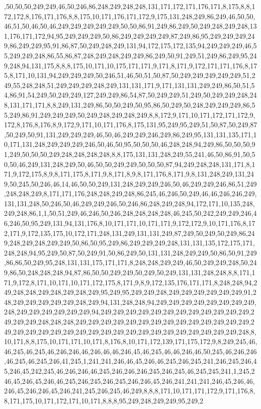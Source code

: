 ,50,50,50,249,249,46,50,246,86,248,249,248,248,131,171,172,171,176,171,8,175,8,8,172,172,8,176,171,176,8,8,175,10,171,176,171,172,9,175,131,248,249,86,249,46,50,50,46,51,50,46,50,46,249,249,249,249,249,50,50,86,91,249,86,249,50,249,248,249,248,131,176,171,172,94,95,249,249,249,50,86,249,249,249,249,87,249,86,95,249,249,249,249,86,249,249,95,91,86,87,50,249,248,249,131,94,172,175,172,135,94,249,249,249,46,55,249,249,248,86,55,86,87,248,249,248,249,249,86,249,50,91,249,51,249,86,249,95,249,248,94,131,175,8,8,8,175,10,171,10,175,171,171,9,171,8,171,9,172,171,171,176,8,175,8,171,10,131,94,249,249,249,50,246,51,46,50,51,50,87,50,249,249,249,249,249,51,249,55,248,248,51,249,249,249,248,249,131,131,171,9,171,131,131,249,249,86,50,51,54,86,91,54,249,50,249,249,127,249,249,86,54,87,50,249,249,51,249,50,249,249,248,248,131,171,171,8,8,249,131,249,86,50,50,249,50,95,86,50,249,50,248,249,249,249,86,55,249,86,91,249,249,249,50,249,248,249,248,249,8,8,172,9,171,10,171,172,171,172,9,172,8,176,8,176,8,9,172,9,171,10,171,176,8,175,131,95,249,95,249,51,50,87,50,249,87,50,249,50,91,131,249,249,249,46,50,46,249,249,246,249,86,249,95,131,131,135,171,10,171,131,248,249,249,249,246,50,46,50,95,50,50,50,46,248,248,94,249,86,50,50,50,91,249,50,50,50,249,248,248,248,248,8,8,175,131,131,248,249,55,241,46,50,86,91,50,50,50,46,249,131,248,249,50,46,50,50,249,249,50,50,50,87,94,249,248,248,131,171,8,171,9,172,175,8,9,8,171,175,8,171,9,8,171,8,9,8,171,176,8,171,9,8,131,248,249,131,249,50,245,50,246,46,14,46,50,50,249,131,248,249,249,246,50,46,249,249,246,86,51,249,248,248,249,8,171,171,176,248,248,249,248,86,245,46,246,50,249,46,46,246,246,249,131,131,248,50,246,50,46,249,249,246,50,246,86,248,249,248,94,172,171,10,135,248,249,248,86,1,1,50,51,249,46,246,50,246,248,248,248,248,46,245,50,242,249,249,246,46,246,50,95,249,131,94,131,176,8,10,171,171,10,171,171,9,172,172,9,10,171,176,8,172,171,9,172,135,175,10,172,171,248,131,249,131,131,249,87,249,50,249,50,249,86,249,248,249,248,249,249,50,86,50,95,249,86,249,249,249,248,131,131,135,172,175,171,248,248,94,95,249,50,87,50,249,91,50,86,249,50,131,131,248,249,249,50,86,50,91,249,86,86,50,249,95,248,131,131,175,171,171,8,248,248,249,249,46,50,249,249,248,50,249,86,50,248,248,248,94,87,86,50,50,249,249,50,249,50,249,131,131,248,248,8,8,171,171,9,172,8,171,10,171,10,171,172,175,8,171,9,8,9,172,135,176,171,171,8,248,248,94,249,248,248,249,248,249,248,249,95,249,95,249,249,248,249,249,249,249,249,249,91,248,249,249,249,249,249,248,249,94,131,248,248,94,249,249,249,249,249,249,249,249,248,249,249,249,249,249,249,94,249,249,249,249,249,249,249,249,249,249,249,249,249,249,249,248,248,248,249,249,249,249,249,249,249,249,249,249,249,249,249,249,249,249,249,249,249,249,249,249,249,249,249,249,249,249,249,249,249,249,249,248,8,10,171,8,8,175,10,171,171,10,171,8,176,8,10,171,172,139,171,175,172,9,8,249,245,46,46,245,46,245,46,246,246,46,246,46,46,246,45,46,245,46,46,246,46,50,245,46,246,246,46,245,46,245,246,41,245,1,241,241,246,46,45,246,46,245,246,245,241,246,245,246,45,246,45,242,245,46,246,246,46,245,246,246,246,245,246,245,46,245,245,241,1,245,246,45,246,45,246,46,245,246,245,246,245,246,246,45,246,241,241,241,246,45,246,46,246,45,246,246,45,246,241,245,246,245,46,249,8,8,8,171,10,171,171,172,9,171,176,8,8,171,175,10,171,172,171,10,171,8,8,8,95,249,248,249,249,95,249,2
